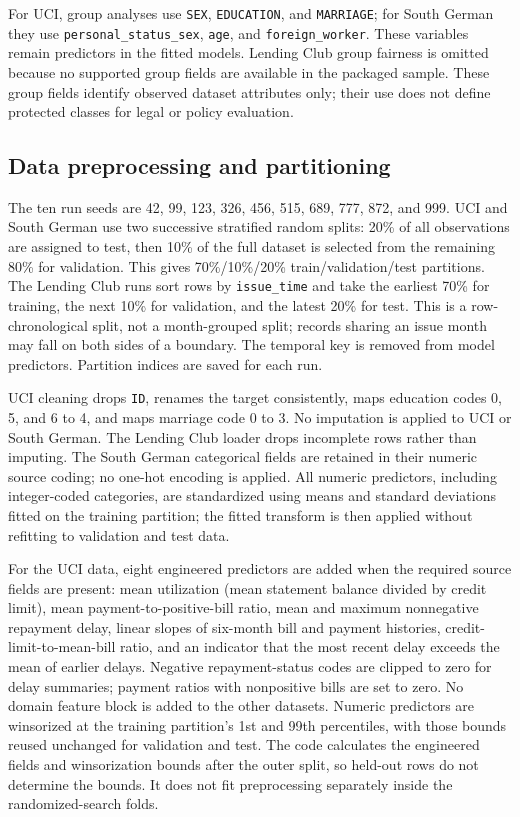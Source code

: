 \documentclass[pdflatex,sn-mathphys-num]{sn-jnl}
\begin{document}
For UCI, group analyses use \texttt{SEX}, \texttt{EDUCATION}, and \texttt{MARRIAGE}; for South German they use \texttt{personal\_status\_sex}, \texttt{age}, and \texttt{foreign\_worker}. These variables remain predictors in the fitted models. Lending Club group fairness is omitted because no supported group fields are available in the packaged sample. These group fields identify observed dataset attributes only; their use does not define protected classes for legal or policy evaluation.

\subsection{Data preprocessing and partitioning}
The ten run seeds are 42, 99, 123, 326, 456, 515, 689, 777, 872, and 999. UCI and South German use two successive stratified random splits: 20\% of all observations are assigned to test, then 10\% of the full dataset is selected from the remaining 80\% for validation. This gives 70\%/10\%/20\% train/validation/test partitions. The Lending Club runs sort rows by \texttt{issue\_time} and take the earliest 70\% for training, the next 10\% for validation, and the latest 20\% for test. This is a row-chronological split, not a month-grouped split; records sharing an issue month may fall on both sides of a boundary. The temporal key is removed from model predictors. Partition indices are saved for each run.

UCI cleaning drops \texttt{ID}, renames the target consistently, maps education codes 0, 5, and 6 to 4, and maps marriage code 0 to 3. No imputation is applied to UCI or South German. The Lending Club loader drops incomplete rows rather than imputing. The South German categorical fields are retained in their numeric source coding; no one-hot encoding is applied. All numeric predictors, including integer-coded categories, are standardized using means and standard deviations fitted on the training partition; the fitted transform is then applied without refitting to validation and test data.

For the UCI data, eight engineered predictors are added when the required source fields are present: mean utilization (mean statement balance divided by credit limit), mean payment-to-positive-bill ratio, mean and maximum nonnegative repayment delay, linear slopes of six-month bill and payment histories, credit-limit-to-mean-bill ratio, and an indicator that the most recent delay exceeds the mean of earlier delays. Negative repayment-status codes are clipped to zero for delay summaries; payment ratios with nonpositive bills are set to zero. No domain feature block is added to the other datasets. Numeric predictors are winsorized at the training partition's 1st and 99th percentiles, with those bounds reused unchanged for validation and test. The code calculates the engineered fields and winsorization bounds after the outer split, so held-out rows do not determine the bounds. It does not fit preprocessing separately inside the randomized-search folds.
\end{document}
